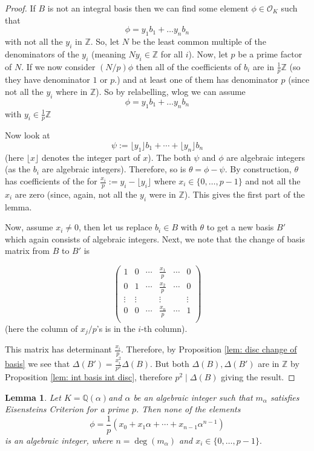 \documentclass[11pt,a4paper]{amsart}
\theoremstyle{plain}
\newtheorem{lem}[subsection]{Lemma}
\theoremstyle{definition}
\theoremstyle{definition}
\newcommand{\ZZ}{\mathbb{Z}}
\def\QQ{\mathbb{Q}}
\def \a{\alpha}
\def \OO {\mathcal{O}}
\begin{document}
	\begin{proof}
		If $B$ is not an integral basis then we can find some element $\phi \in \OO_K$ such that \[\phi=y_1b_1+\dots y_nb_n\] with not all the $y_i$ in $\ZZ$. So, let $N$ be the least common multiple of the denominators of the $y_i$ (meaning $Ny_i \in \ZZ$ for all $i$). Now, let $p$ be a prime factor of $N$. If we now consider $(N/p)\phi$ then all of the coefficients of $b_i$ are in $\frac{1}{p} \ZZ$ (so they have denominator $1$ or $p$.) and at least one of them has denominator $p$ (since not all the $y_i$ where in $\ZZ$). So by relabelling, wlog we can assume \[\phi=y_1b_1+\dots y_nb_n\] with $y_i \in  \frac{1}{p} \ZZ$
		
		Now look at \[\psi:=\lfloor y_1 \rfloor b_1+\cdots+\lfloor y_n \rfloor b_n\] (here $\lfloor x \rfloor$ denotes the integer part of $x$). The both $\psi$ and $\phi$ are algebraic integers (as the $b_i$ are algebraic integers). Therefore, so is $\theta=\phi-\psi$. By construction, $\theta$ has coefficients of the for $\frac{x_i}{p}:=y_i-\lfloor y_i \rfloor$ where $x_i \in \{0,\dots,p-1\}$ and not all the $x_i$ are zero (since, again, not all the $y_i$ were in $\ZZ$). This gives the first part of the lemma.
		
		Now, assume $x_i \neq 0$, then let us replace $b_i \in B$ with $\theta$ to get a new basis $B'$ which again consists of algebraic integers. Next, we note that the change of basis matrix from $B$ to $B'$ is 
		
		\[ \left( \begin{matrix}
			1&0&\cdots& \frac{x_1}{p}& \cdots &0 \\
			0&1&\cdots& \frac{x_2}{p}& \cdots &0 \\
			\vdots& \vdots&&\vdots&&\vdots \\
			0&0&\cdots& \frac{x_n}{p}& \cdots &1 \\
		\end{matrix}                          \right) \](here the column of $x_j/p$'s is in the $i$-th column).
		
		This matrix has determinant $\frac{x_i}{p}.$ Therefore, by 	Proposition \ref{lem: disc change of basis} we see that $\Delta(B')=\frac{x_i^2}{p^2}\Delta(B)$. But both $\Delta(B),\Delta(B')$ are  in $\ZZ$ by Proposition \ref{lem: int basis int disc}, therefore $p^2 \mid \Delta(B)$ giving the result.
	\end{proof}
	
	\begin{lem}\label{lem: eis crit and alg ints}
		Let $K=\QQ(\a)$and $\a$ be an algebraic integer such that $m_\a$ satisfies Eisensteins Criterion for a prime $p$. Then none of the elements \[\phi=\frac{1}{p}(x_0+x_1\a+\cdots+x_{n-1}\a^{n-1})\] is an algebraic integer, where $n=\deg(m_\a)$ and $x_i \in \{0,\dots,p-1\}.$
	\end{lem} 
	
\end{document}
